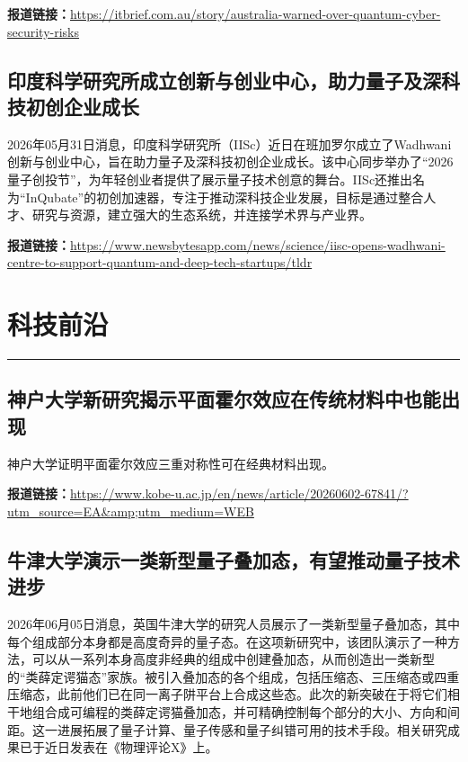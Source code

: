 \documentclass[12pt,a4paper]{ctexart}
\begin{document}
\noindent\textbf{报道链接：}\url{https://itbrief.com.au/story/australia-warned-over-quantum-cyber-security-risks}

\subsection{ 印度科学研究所成立创新与创业中心，助力量子及深科技初创企业成长 }

2026年05月31日消息，印度科学研究所（IISc）近日在班加罗尔成立了Wadhwani创新与创业中心，旨在助力量子及深科技初创企业成长。该中心同步举办了“2026量子创投节”，为年轻创业者提供了展示量子技术创意的舞台。IISc还推出名为“InQubate”的初创加速器，专注于推动深科技企业发展，目标是通过整合人才、研究与资源，建立强大的生态系统，并连接学术界与产业界。

\noindent\textbf{报道链接：}\url{https://www.newsbytesapp.com/news/science/iisc-opens-wadhwani-centre-to-support-quantum-and-deep-tech-startups/tldr}


\newpage
\section{科技前沿}
\vspace{-0.5em}
\noindent\rule{\linewidth}{1.5pt}

\subsection{ 神户大学新研究揭示平面霍尔效应在传统材料中也能出现 }

神户大学证明平面霍尔效应三重对称性可在经典材料出现。

\noindent\textbf{报道链接：}\url{https://www.kobe-u.ac.jp/en/news/article/20260602-67841/?utm\_source=EA\&amp;utm\_medium=WEB}

\subsection{ 牛津大学演示一类新型量子叠加态，有望推动量子技术进步 }

2026年06月05日消息，英国牛津大学的研究人员展示了一类新型量子叠加态，其中每个组成部分本身都是高度奇异的量子态。在这项新研究中，该团队演示了一种方法，可以从一系列本身高度非经典的组成中创建叠加态，从而创造出一类新型的“类薛定谔猫态”家族。被引入叠加态的各个组成，包括压缩态、三压缩态或四重压缩态，此前他们已在同一离子阱平台上合成这些态。此次的新突破在于将它们相干地组合成可编程的类薛定谔猫叠加态，并可精确控制每个部分的大小、方向和间距。这一进展拓展了量子计算、量子传感和量子纠错可用的技术手段。相关研究成果已于近日发表在《物理评论X》上。
\end{document}
